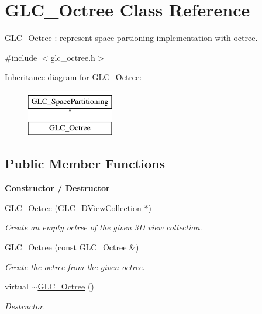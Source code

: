 \hypertarget{class_g_l_c___octree}{\section{G\-L\-C\-\_\-\-Octree Class Reference}
\label{class_g_l_c___octree}
}


\hyperlink{class_g_l_c___octree}{G\-L\-C\-\_\-\-Octree} \-: represent space partioning implementation with octree.  




{\ttfamily \#include $<$glc\-\_\-octree.\-h$>$}

Inheritance diagram for G\-L\-C\-\_\-\-Octree\-:\begin{figure}[H]
\begin{center}
\leavevmode
\includegraphics[height=2.000000cm]{class_g_l_c___octree}
\end{center}
\end{figure}
\subsection*{Public Member Functions}
\begin{Indent}{\bf Constructor / Destructor}\par
\begin{DoxyCompactItemize}
\item 
\hyperlink{class_g_l_c___octree_ac43245d51655bc182815b53204404046}{G\-L\-C\-\_\-\-Octree} (\hyperlink{class_g_l_c__3_d_view_collection}{G\-L\-C\-\_\-D\-View\-Collection} $\ast$)
\begin{DoxyCompactList}\small\item\em Create an empty octree of the given 3\-D view collection. \end{DoxyCompactList}\item 
\hyperlink{class_g_l_c___octree_a16a96b9d43ab28302f5bf6ed069b721d}{G\-L\-C\-\_\-\-Octree} (const \hyperlink{class_g_l_c___octree}{G\-L\-C\-\_\-\-Octree} \&)
\begin{DoxyCompactList}\small\item\em Create the octree from the given octree. \end{DoxyCompactList}\item 
virtual \hyperlink{class_g_l_c___octree_a6910bac432d05282b516a356e63176f5}{$\sim$\-G\-L\-C\-\_\-\-Octree} ()
\begin{DoxyCompactList}\small\item\em Destructor. \end{DoxyCompactList}\end{DoxyCompactItemize}
\end{Indent}
